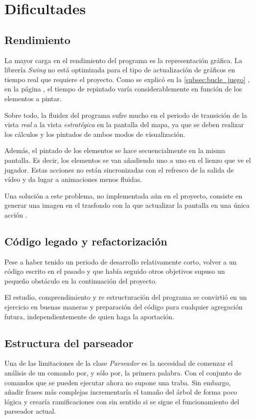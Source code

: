\documentclass[a4paper,
	11pt,
	parskip=full,
	bibliography=totoc,
	twoside
	]{scrartcl}
\let\oldsection\section
\def\section{\cleardoubleoddpage\oldsection}
\begin{document}
\section{Dificultades}
\label{sec:dificultades}
	\subsection{Rendimiento}
	\label{subsec:rendimiento}
		La mayor carga en el rendimiento del programa es la representación gráfica. La librería \textit{Swing} no está optimizada para el tipo de actualización de gráficos en tiempo real que requiere el proyecto. Como se explicó en la \autoref{subsec:bucle_juego} , en la página \pageref{subsec:bucle_juego}, el tiempo de repintado varía considerablemente en función de los elementos a pintar.
		
		Sobre todo, la fluidez del programa sufre mucho en el periodo de transición de la vista \textit{real} a la vista \textit{estratégica} en la pantalla del mapa, ya que se deben realizar los cálculos y los pintados de ambos modos de visualización.
		
		Además, el pintado de los elementos se hace secuencialmente en la misma pantalla. Es decir, los elementos se van añadiendo uno a uno en el lienzo que ve el jugador. Estas acciones no están sincronizadas con el refresco de la salida de vídeo y da lugar a animaciones menos fluidas.
		
		Una solución a este problema, no implementada aún en el proyecto, consiste en generar una imagen en el trasfondo con la que actualizar la pantalla en una única acción \cite{so_graphics_performance}.
		
	\subsection{Código legado y refactorización}
	\label{subsec:codigo_legado}
		Pese a haber tenido un periodo de desarrollo relativamente corto, volver a un código escrito en el pasado y que había seguido otros objetivos supuso un pequeño obstáculo en la continuación del proyecto. 
		
		El estudio, comprendimiento y re estructuración del programa se convirtió en un ejercicio en buenas maneras y preparación del código para cualquier agregación futura, independientemente de quien haga la aportación. \cite{legacy_code}
		
	\subsection{Estructura del parseador}
	\label{subsec:dif_parseador}
		Una de las limitaciones de la clase \textit{Parseador} es la necesidad de comenzar el análisis de un comando por, y sólo por, la primera palabra. Con el conjunto de comandos que se pueden ejecutar ahora no supone una traba. Sin embargo, añadir frases más complejas incrementaría el tamaño del árbol de forma poco lógica y crearía ramificaciones con sin sentido si se sigue el funcionamiento del parseador actual.
		
\end{document}
